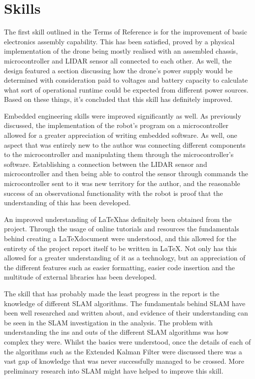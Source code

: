 		\section{Skills}
		The first skill outlined in the Terms of Reference is for the improvement of basic electronics assembly capability. This has been satisfied, proved by a physical implementation of the drone being mostly realised with an assembled chassis, microcontroller and LIDAR sensor all connected to each other. As well, the design featured a section discussing how the drone's power supply would be determined with consideration paid to voltages and battery capacity to calculate what sort of operational runtime could be expected from different power sources. Based on these things, it's concluded that this skill has definitely improved.
		
		Embedded engineering skills were improved significantly as well. As previously discussed, the implementation of the robot's program on a microcontroller allowed for a greater appreciation of writing embedded software. As well, one aspect that was entirely new to the author was connecting different components to the microcontroller and manipulating them through the microcontroller's software. Establishing a connection between the LIDAR sensor and microcontroller and then being able to control the sensor through commands the microcontroller sent to it was new territory for the author, and the reasonable success of an observational functionality with the robot is proof that the understanding of this has been developed.
		
		An improved understanding of \LaTeX has definitely been obtained from the project. Through the usage of online tutorials and resources the fundamentals behind creating a \LaTeX document were understood, and this allowed for the entirety of the project report itself to be written in \LaTeX. Not only has this allowed for a greater understanding of it as a technology, but an appreciation of the different features such as easier formatting, easier code insertion and the multitude of external libraries has been developed.
		
		The skill that has probably made the least progress in the report is the knowledge of different SLAM algorithms. The fundamentals behind SLAM have been well researched and written about, and evidence of their understanding can be seen in the SLAM investigation in the analysis. The problem with understanding the ins and outs of the different SLAM algorithms was how complex they were. Whilst the basics were understood, once the details of each of the algorithms such as the Extended Kalman Filter were discussed there was a vast gap of knowledge that was never successfully managed to be crossed. More preliminary research into SLAM might have helped to improve this skill. 
		
